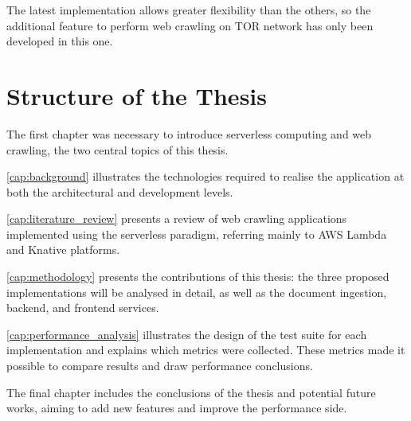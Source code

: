 \documentclass[../thesis.tex]{subfiles}
\begin{document}
The latest implementation allows greater flexibility than the others, so the additional feature to perform web crawling on \acrfull{TOR} network \cite{site:tor_project} has only been developed in this one.

\section{Structure of the Thesis}\label{sec:struture_thesis}
The first chapter was necessary to introduce serverless computing and web crawling, the two central topics of this thesis.

\autoref{cap:background} illustrates the technologies required to realise the application at both the architectural and development levels.

\autoref{cap:literature_review} presents a review of web crawling applications implemented using the serverless paradigm, referring mainly to \acrshort{AWS} Lambda \cite{site:aws_lambda} and Knative \cite{site:knative} platforms.

\autoref{cap:methodology} presents the contributions of this thesis: the three proposed implementations will be analysed in detail, as well as the document ingestion, backend, and frontend services.

\autoref{cap:performance_analysis} illustrates the design of the test suite for each implementation and explains which metrics were collected. These metrics made it possible to compare results and draw performance conclusions.

The final chapter includes the conclusions of the thesis and potential future works, aiming to add new features and improve the performance side.
\end{document}
